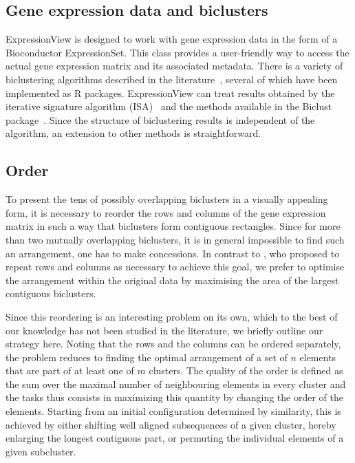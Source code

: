 \documentclass[round]{bioinfo}
\begin{document}
\subsection{Gene expression data and biclusters}
ExpressionView is designed to work with gene expression data in the form of a Bioconductor ExpressionSet. This class provides a user-friendly way to access the actual gene expression matrix and its associated metadata. There is a variety of biclustering algorithms described in the literature~\citep{madeira04,prelic06}, several of which have been implemented as R packages. ExpressionView can treat results obtained by the iterative signature algorithm (ISA)~\citep{bergmann03}%
and the methods available in the Biclust package~\citep{kaiser08}. Since the structure of biclustering results is independent of the algorithm, an extension to other methods is straightforward.

\subsection{Order}
To present the tens of possibly overlapping biclusters in a visually appealing form, it is necessary to reorder the rows and columns of the gene expression matrix in such a way that biclusters form contiguous rectangles. Since for more than two mutually overlapping biclusters, it is in general impossible to find such an arrangement, one has to make concessions. In contrast to \cite{grothaus06}, who proposed to repeat rows and columns as necessary to achieve this goal, we prefer to optimise the arrangement within the original data by maximising the area of the largest contiguous biclusters. 

Since this reordering is an interesting problem on its own, which to the best of our knowledge has not been studied in the literature, we briefly outline our strategy here. Noting that the rows and the columns can be ordered separately, the problem reduces to finding the optimal arrangement of a set of $n$ elements that are part of at least one of $m$ clusters. The quality of the order is defined as the sum over the maximal number of neighbouring elements in every cluster and the tasks thus consists in maximizing this quantity by changing the order of the elements. Starting from an initial configuration determined by similarity, this is achieved by either shifting well aligned subsequences of a given cluster, hereby enlarging the longest contiguous part, or permuting the individual elements of a given subcluster. 
\end{document}
